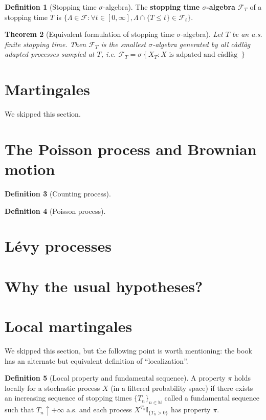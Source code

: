 \documentclass[openany,oneside]{book}
\newtheorem{thm}{Theorem}[section]
\theoremstyle{definition}
\newtheorem{defn}[thm]{Definition}
\theoremstyle{remark}
\newcommand{\I}{\mathbb{I}} %
\begin{document}
\begin{defn}[Stopping time $\sigma$-algebra]
The \textbf{stopping time $\sigma$-algebra} $\mathcal{F}_T$ of a stopping time $T$ is $\{\Lambda \in \mathcal{F} : \forall t\in[0,\infty], \Lambda\cap\{T\le t\} \in \mathcal{F}_t\}$.
\end{defn}


\begin{thm}[Equivalent formulation of stopping time $\sigma$-algebra]
Let $T$ be an a.s. finite stopping time. Then $\mathcal{F}_T$ is the smallest $\sigma$-algebra generated by all c\`adl\`ag adapted processes sampled at $T$, i.e. $\mathcal{F}_T = \sigma\left\{X_T : X \textrm{ is adpated and c\`adl\`ag } \right\}$
\end{thm}

\section{Martingales}
We skipped this section.


\section{The Poisson process and Brownian motion}

\begin{defn}[Counting process]

\end{defn}


\begin{defn}[Poisson process]

\end{defn}


\section{L\'evy processes}


\section{Why the usual hypotheses?}

\section{Local martingales}
We skipped this section, but the following point is worth mentioning: the book has an alternate but equivalent definition of ``localization''.

\begin{defn}[Local property and fundamental sequence]
A property $\pi$ holds locally for a stochastic process $X$ (in a filtered probability space) if there exists an increasing sequence of stopping times $\{T_n\}_{n\in\mathbb{N}}$ called a fundamental sequence such that $T_n \uparrow +\infty$ a.s. and each process $X^{T_n} \I_{\{T_n >0\}}$ has property $\pi$. 
\end{defn}
\end{document}
